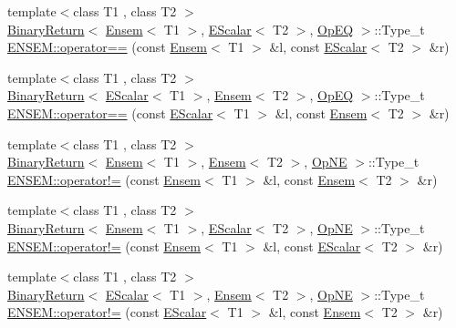 \begin{DoxyCompactItemize}
\item 
{\footnotesize template$<$class T1 , class T2 $>$ }\\\mbox{\hyperlink{structENSEM_1_1BinaryReturn}{Binary\+Return}}$<$ \mbox{\hyperlink{classENSEM_1_1Ensem}{Ensem}}$<$ T1 $>$, \mbox{\hyperlink{classENSEM_1_1EScalar}{E\+Scalar}}$<$ T2 $>$, \mbox{\hyperlink{structENSEM_1_1OpEQ}{Op\+EQ}} $>$\+::Type\+\_\+t \mbox{\hyperlink{group__eensem_ga4b52007b3c1511c746a46b46e5b145b1}{E\+N\+S\+E\+M\+::operator==}} (const \mbox{\hyperlink{classENSEM_1_1Ensem}{Ensem}}$<$ T1 $>$ \&l, const \mbox{\hyperlink{classENSEM_1_1EScalar}{E\+Scalar}}$<$ T2 $>$ \&r)
\item 
{\footnotesize template$<$class T1 , class T2 $>$ }\\\mbox{\hyperlink{structENSEM_1_1BinaryReturn}{Binary\+Return}}$<$ \mbox{\hyperlink{classENSEM_1_1EScalar}{E\+Scalar}}$<$ T1 $>$, \mbox{\hyperlink{classENSEM_1_1Ensem}{Ensem}}$<$ T2 $>$, \mbox{\hyperlink{structENSEM_1_1OpEQ}{Op\+EQ}} $>$\+::Type\+\_\+t \mbox{\hyperlink{group__eensem_gade522cbdb1f590216dd1c5e3dd034e79}{E\+N\+S\+E\+M\+::operator==}} (const \mbox{\hyperlink{classENSEM_1_1EScalar}{E\+Scalar}}$<$ T1 $>$ \&l, const \mbox{\hyperlink{classENSEM_1_1Ensem}{Ensem}}$<$ T2 $>$ \&r)
\item 
{\footnotesize template$<$class T1 , class T2 $>$ }\\\mbox{\hyperlink{structENSEM_1_1BinaryReturn}{Binary\+Return}}$<$ \mbox{\hyperlink{classENSEM_1_1Ensem}{Ensem}}$<$ T1 $>$, \mbox{\hyperlink{classENSEM_1_1Ensem}{Ensem}}$<$ T2 $>$, \mbox{\hyperlink{structENSEM_1_1OpNE}{Op\+NE}} $>$\+::Type\+\_\+t \mbox{\hyperlink{group__eensem_ga9f462a3d207e1a214ab95765f6fb90d3}{E\+N\+S\+E\+M\+::operator!=}} (const \mbox{\hyperlink{classENSEM_1_1Ensem}{Ensem}}$<$ T1 $>$ \&l, const \mbox{\hyperlink{classENSEM_1_1Ensem}{Ensem}}$<$ T2 $>$ \&r)
\item 
{\footnotesize template$<$class T1 , class T2 $>$ }\\\mbox{\hyperlink{structENSEM_1_1BinaryReturn}{Binary\+Return}}$<$ \mbox{\hyperlink{classENSEM_1_1Ensem}{Ensem}}$<$ T1 $>$, \mbox{\hyperlink{classENSEM_1_1EScalar}{E\+Scalar}}$<$ T2 $>$, \mbox{\hyperlink{structENSEM_1_1OpNE}{Op\+NE}} $>$\+::Type\+\_\+t \mbox{\hyperlink{group__eensem_ga8086f697f52b0363688785b35a8cdca3}{E\+N\+S\+E\+M\+::operator!=}} (const \mbox{\hyperlink{classENSEM_1_1Ensem}{Ensem}}$<$ T1 $>$ \&l, const \mbox{\hyperlink{classENSEM_1_1EScalar}{E\+Scalar}}$<$ T2 $>$ \&r)
\item 
{\footnotesize template$<$class T1 , class T2 $>$ }\\\mbox{\hyperlink{structENSEM_1_1BinaryReturn}{Binary\+Return}}$<$ \mbox{\hyperlink{classENSEM_1_1EScalar}{E\+Scalar}}$<$ T1 $>$, \mbox{\hyperlink{classENSEM_1_1Ensem}{Ensem}}$<$ T2 $>$, \mbox{\hyperlink{structENSEM_1_1OpNE}{Op\+NE}} $>$\+::Type\+\_\+t \mbox{\hyperlink{group__eensem_ga312278f2450b3a4afdfd443566c93d0a}{E\+N\+S\+E\+M\+::operator!=}} (const \mbox{\hyperlink{classENSEM_1_1EScalar}{E\+Scalar}}$<$ T1 $>$ \&l, const \mbox{\hyperlink{classENSEM_1_1Ensem}{Ensem}}$<$ T2 $>$ \&r)

\end{DoxyCompactItemize}
